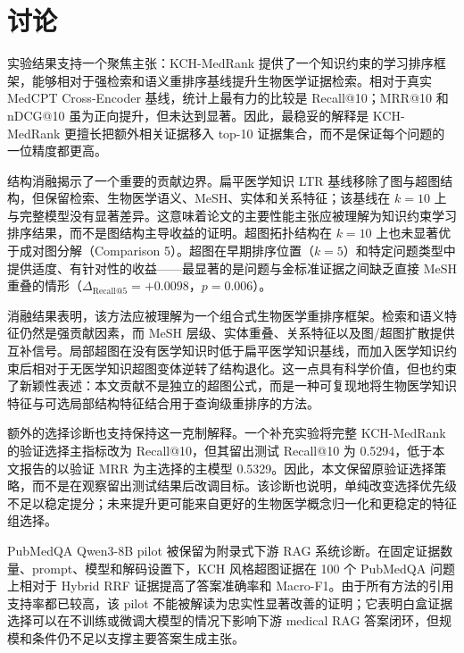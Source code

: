 \section{讨论}

实验结果支持一个聚焦主张：KCH-MedRank 提供了一个知识约束的学习排序框架，能够相对于强检索和语义重排序基线提升生物医学证据检索。相对于真实 MedCPT Cross-Encoder 基线，统计上最有力的比较是 Recall@10；MRR@10 和 nDCG@10 虽为正向提升，但未达到显著。因此，最稳妥的解释是 KCH-MedRank 更擅长把额外相关证据移入 top-10 证据集合，而不是保证每个问题的一位精度都更高。

结构消融揭示了一个重要的贡献边界。扁平医学知识 LTR 基线移除了图与超图结构，但保留检索、生物医学语义、MeSH、实体和关系特征；该基线在 $k{=}10$ 上与完整模型没有显著差异。这意味着论文的主要性能主张应被理解为知识约束学习排序结果，而不是图结构主导收益的证明。超图拓扑结构在 $k{=}10$ 上也未显著优于成对图分解（Comparison 5）。超图在早期排序位置（$k{=}5$）和特定问题类型中提供适度、有针对性的收益——最显著的是问题与金标准证据之间缺乏直接 MeSH 重叠的情形（$\Delta_{\text{Recall@5}} = +0.0098$，$p{=}0.006$）。

消融结果表明，该方法应被理解为一个组合式生物医学重排序框架。检索和语义特征仍然是强贡献因素，而 MeSH 层级、实体重叠、关系特征以及图/超图扩散提供互补信号。局部超图在没有医学知识时低于扁平医学知识基线，而加入医学知识约束后相对于无医学知识超图变体逆转了结构退化。这一点具有科学价值，但也约束了新颖性表述：本文贡献不是独立的超图公式，而是一种可复现地将生物医学知识特征与可选局部结构特征结合用于查询级重排序的方法。

额外的选择诊断也支持保持这一克制解释。一个补充实验将完整 KCH-MedRank 的验证选择主指标改为 Recall@10，但其留出测试 Recall@10 为 0.5294，低于本文报告的以验证 MRR 为主选择的主模型 0.5329。因此，本文保留原验证选择策略，而不是在观察留出测试结果后改调目标。该诊断也说明，单纯改变选择优先级不足以稳定提分；未来提升更可能来自更好的生物医学概念归一化和更稳定的特征组选择。

PubMedQA Qwen3-8B pilot 被保留为附录式下游 RAG 系统诊断。在固定证据数量、prompt、模型和解码设置下，KCH 风格超图证据在 100 个 PubMedQA 问题上相对于 Hybrid RRF 证据提高了答案准确率和 Macro-F1。由于所有方法的引用支持率都已较高，该 pilot 不能被解读为忠实性显著改善的证明；它表明白盒证据选择可以在不训练或微调大模型的情况下影响下游 medical RAG 答案闭环，但规模和条件仍不足以支撑主要答案生成主张。

